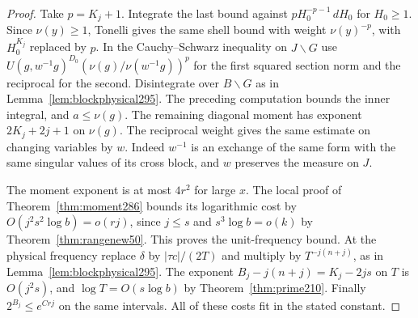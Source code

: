 \documentclass[a4paper,11pt]{article}
\theoremstyle{definition}
\theoremstyle{remark}
\numberwithin{equation}{section}
\begin{document}
\begin{proof}
Take \(p=K_j+1\). Integrate the last bound against
\(pH_0^{-p-1}\,dH_0\) for \(H_0\ge1\). Since \(\nu(y)\ge1\),
Tonelli gives the same shell bound with weight
\(\nu(y)^{-p}\), with \(H_0^{K_j}\) replaced by \(p\).
In the Cauchy--Schwarz inequality on \(J\backslash G\) use
\(U(g,w^{-1}g)^{D_0}(\nu(g)/\nu(w^{-1}g))^p\) for the first
squared section norm and the reciprocal for the second.
Disintegrate over \(B\backslash G\) as in
Lemma~\ref{lem:blockphysical295}. The preceding computation
bounds the inner integral, and \(a\le\nu(g)\). The remaining
diagonal moment has exponent \(2K_j+2j+1\) on \(\nu(g)\).
The reciprocal weight gives the same estimate on changing
variables by \(w\). Indeed \(w^{-1}\) is an exchange of the
same form with the same singular values of its cross block,
and \(w\) preserves the measure on \(J\).

The moment exponent is at most \(4r^2\) for large \(x\).
The local proof of Theorem~\ref{thm:moment286} bounds its
logarithmic cost by \(O(j^2s^2\log b)=o(rj)\), since
\(j\le s\) and \(s^3\log b=o(k)\) by
Theorem~\ref{thm:rangenew50}. This proves the unit-frequency
bound. At the physical frequency replace \(\delta\) by
\(|\tau c|/(2T)\) and multiply by \(T^{-j(n+j)}\), as
in Lemma~\ref{lem:blockphysical295}. The exponent
\(B_j-j(n+j)=K_j-2js\) on \(T\) is \(O(j^2s)\), and
\(\log T=O(s\log b)\) by Theorem~\ref{thm:prime210}.
Finally \(2^{B_j}\le e^{Crj}\) on the same intervals.
All of these costs fit in the stated constant.
\end{proof}
\end{document}
